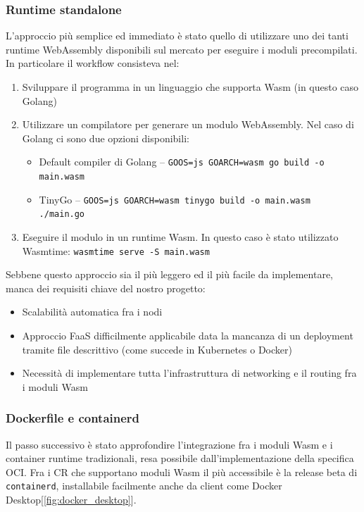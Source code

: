 \subsubsection{Runtime standalone}

L'approccio più semplice ed immediato è stato quello di utilizzare uno dei tanti runtime WebAssembly disponibili sul mercato per eseguire i moduli precompilati. In particolare il workflow consisteva nel:
\begin{enumerate}
    \item Sviluppare il programma in un linguaggio che supporta Wasm (in questo caso Golang)
    \item Utilizzare un compilatore per generare un modulo WebAssembly. Nel caso di Golang ci sono due opzioni disponibili:
    \begin{itemize}
        \item Default compiler di Golang -- \lstinline{GOOS=js GOARCH=wasm go build -o main.wasm}
        \item TinyGo -- \lstinline{GOOS=js GOARCH=wasm tinygo build -o main.wasm ./main.go}
    \end{itemize}
    
    \item Eseguire il modulo in un runtime Wasm. In questo caso è stato utilizzato Wasmtime:
    \lstinline{wasmtime serve -S main.wasm}
\end{enumerate}

Sebbene questo approccio sia il più leggero ed il più facile da implementare, manca dei requisiti chiave del nostro progetto:
\begin{itemize}
    \item Scalabilità automatica fra i nodi
    \item Approccio FaaS difficilmente applicabile data la mancanza di un deployment tramite file descrittivo (come succede in Kubernetes o Docker)
    \item Necessità di implementare tutta l'infrastruttura di networking e il routing fra i moduli Wasm
\end{itemize}

\subsubsection{Dockerfile e containerd}

Il passo successivo è stato approfondire l'integrazione fra i moduli Wasm e i container runtime tradizionali, resa possibile dall'implementazione della specifica OCI. Fra i CR che supportano moduli Wasm il più accessibile è la release beta di \texttt{containerd}\cite{containerd_runwasi}, installabile facilmente anche da client come Docker Desktop[\ref{fig:docker_desktop}].


